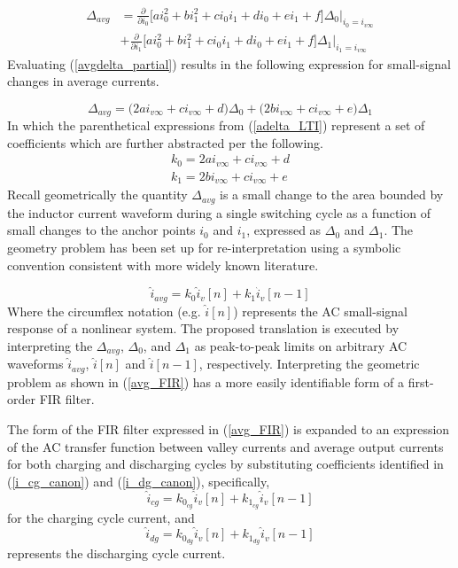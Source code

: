 \documentclass[conference]{IEEEtran}
\begin{document}
\begin{align}
	\Delta_{avg} &= 
	\frac{\partial}{\partial i_0} 
	\bigg [
	a i_0^2+b i_1^2+c i_0i_1+d i_0+e i_1+f \bigg ] 
	\Delta_0 \bigg |_{i_0=i_{v\infty}} \nonumber \\
	&+ 
	\frac{\partial}{\partial i_1} 
	\bigg [
	a i_0^2+b i_1^2+c i_0i_1+d i_0+e i_1+f \bigg ] 
	\Delta_1 \bigg |_{i_1=i_{v\infty}}
	\label{avgdelta_partial}
\end{align}
Evaluating (\ref{avgdelta_partial}) results in the following expression for small-signal changes in average currents.

\begin{equation}
	\Delta_{avg} = \big ( 2 a i_{v\infty} + c i_{v\infty} + d  \big) \Delta_0 + 
	\big ( 2 b i_{v\infty} + c i_{v\infty} + e  \big) \Delta_1
	\label{adelta_LTI}
\end{equation}
In which the parenthetical expressions from (\ref{adelta_LTI}) represent a set of coefficients which are further abstracted per the following.
\begin{align}
k_0 = 2 a i_{v\infty} + c i_{v\infty} + d \nonumber \\
k_1 = 2 b i_{v\infty} + c i_{v\infty} + e 
\end{align}
Recall geometrically the quantity $\Delta_{avg}$ is a small change to the area bounded by the inductor current waveform during a single switching cycle as a function of small changes to the anchor points $i_0$ and $i_1$, expressed as $\Delta_0$ and $\Delta_1$. The geometry problem has been set up for re-interpretation using a symbolic convention consistent with more widely known literature.

\begin{equation}
		\hat{i}_{avg} = k_0 \hat{i}_v[n] + 
	k_1 \hat{i}_v[n-1]
	\label{avg_FIR}
\end{equation}
Where the circumflex notation (e.g. $\hat{i}[n]$) represents the AC small-signal response of a nonlinear system. The proposed translation is executed by interpreting the $\Delta_{avg}$, $\Delta_0$, and $\Delta_1$ as peak-to-peak limits on arbitrary AC waveforms $\hat{i}_{avg}$, $\hat{i}[n]$ and $\hat{i}[n-1]$, respectively. Interpreting the geometric problem as shown in (\ref{avg_FIR}) has a more easily identifiable form of a first-order FIR filter.

The form of the FIR filter expressed in (\ref{avg_FIR}) is expanded to an expression of the AC transfer function between valley currents and average output currents for both charging and discharging cycles by substituting coefficients identified in (\ref{i_cg_canon}) and (\ref{i_dg_canon}), specifically,
\begin{equation}
\hat{i}_{cg} = k_{0_{cg}} \hat{i}_{v}[n] + 
k_{1_{cg}} \hat{i}_v[n-1]
\label{avg_FIR_cg}
\end{equation}
for the charging cycle current, and
\begin{equation}
\hat{i}_{dg} = k_{0_{dg}} \hat{i}_{v}[n] + 
k_{1_{dg}} \hat{i}_v[n-1]
\label{avg_FIR_dg}
\end{equation}
represents the discharging cycle current.
\end{document}
